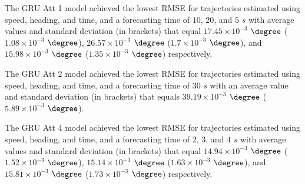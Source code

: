 \begin{table}[!ht]
	\centering
	\caption{The average RMSE ($\times 10^{-2}$), with standard deviation in brackets, across $k$-fold validation datasets for the trajectories in the $k$-fold testing datasets estimated using speed, heading, and time, different RNN models, and forecasting times.}
	\label{tab:best_speed_actual_dir_RMSE}
\end{table}

The GRU Att 1 model achieved the lowest RMSE for trajectories estimated using speed, heading, and time, and a forecasting time of $10$, $20$, and $5$ $s$ with average values and standard deviation (in brackets) that equal $17.45 \times 10^{-3}$ $\degree$ ($1.08 \times 10^{-3}$ $\degree$), $26.57 \times 10^{-3}$ $\degree$ ($1.7 \times 10^{-3}$ $\degree$), and $15.98 \times 10^{-3}$ $\degree$ ($1.35 \times 10^{-3}$ $\degree$) respectively.

The GRU Att 2 model achieved the lowest RMSE for trajectories estimated using speed, heading, and time, and a forecasting time of $30$ $s$ with an average value and standard deviation (in brackets) that equals $39.19 \times 10^{-3}$ $\degree$ ($5.89 \times 10^{-3}$ $\degree$).

The GRU Att 4 model achieved the lowest RMSE for trajectories estimated using speed, heading, and time, and a forecasting time of $2$, $3$, and $4$ $s$ with average values and standard deviation (in brackets) that equal $14.94 \times 10^{-3}$ $\degree$ ($1.52 \times 10^{-3}$ $\degree$), $15.14 \times 10^{-3}$ $\degree$ ($1.63 \times 10^{-3}$ $\degree$), and $15.81 \times 10^{-3}$ $\degree$ ($1.73 \times 10^{-3}$ $\degree$) respectively.


